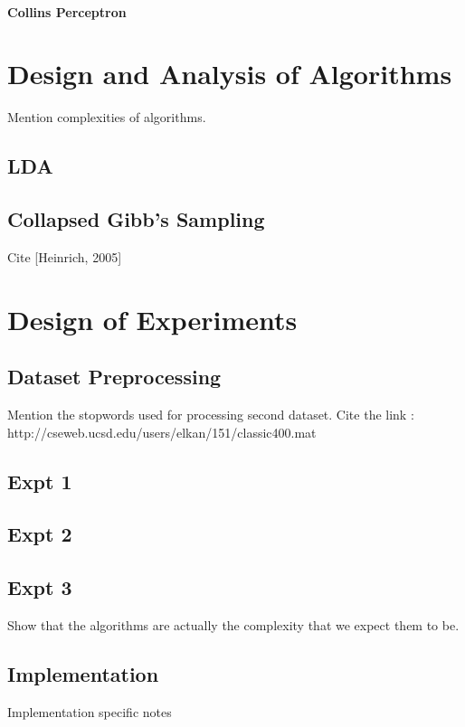 \documentclass[11pt,a4paper,oneside]{article}
\begin{document}
\paragraph*{Collins Perceptron}

\section{Design and Analysis of Algorithms}

\label{sec:Algorithms}
Mention complexities of algorithms.

\subsection{LDA}

\subsection{Collapsed Gibb's Sampling}
Cite [Heinrich, 2005]

\section{Design of Experiments}

\subsection{Dataset Preprocessing}
Mention the stopwords used for processing second dataset.
Cite the link : http://cseweb.ucsd.edu/users/elkan/151/classic400.mat

\subsection{Expt 1}

\subsection{Expt 2}

\subsection{Expt 3}
Show that the algorithms are actually the complexity that we expect them to be.

\subsection{Implementation}
Implementation specific notes
\end{document}
